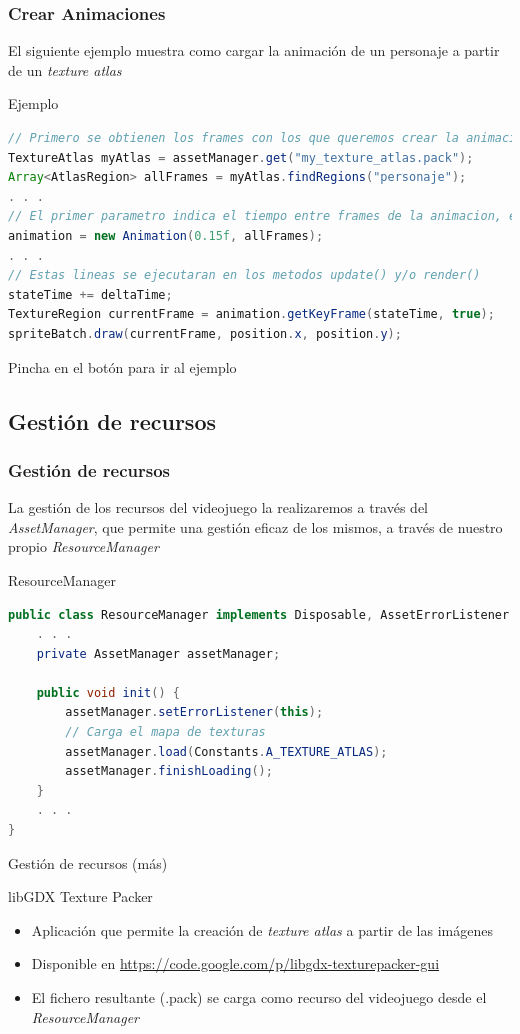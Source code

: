 \documentclass[xcolor={dvipsnames}]{beamer}
\begin{document}
\begin{frame}[fragile]\frametitle{Crear Animaciones}
	El siguiente ejemplo muestra como cargar la animación de un personaje a partir de un \emph{texture atlas}
	\begin{exampleblock}{Ejemplo}
    \begin{lstlisting}[language=java]
// Primero se obtienen los frames con los que queremos crear la animacion
TextureAtlas myAtlas = assetManager.get("my_texture_atlas.pack");
Array<AtlasRegion> allFrames = myAtlas.findRegions("personaje");
. . .
// El primer parametro indica el tiempo entre frames de la animacion, en segundos 
animation = new Animation(0.15f, allFrames);
. . .
// Estas lineas se ejecutaran en los metodos update() y/o render()
stateTime += deltaTime;
TextureRegion currentFrame = animation.getKeyFrame(stateTime, true);
spriteBatch.draw(currentFrame, position.x, position.y);
    \end{lstlisting}
    \end{exampleblock}
    Pincha en el botón para ir al ejemplo \href{https://github.com/sfaci/libgdx}{}
\end{frame}

\subsection{Gestión de recursos}
\begin{frame}[fragile]\frametitle{Gestión de recursos}
	La gestión de los recursos del videojuego la realizaremos a través del \emph{AssetManager}, que permite una gestión eficaz de los mismos, a través de nuestro propio \emph{ResourceManager}
	\begin{exampleblock}{ResourceManager}
	\begin{lstlisting}[language=java]
public class ResourceManager implements Disposable, AssetErrorListener {
    . . .
    private AssetManager assetManager;

    public void init() {
        assetManager.setErrorListener(this);
        // Carga el mapa de texturas
        assetManager.load(Constants.A_TEXTURE_ATLAS);
        assetManager.finishLoading();
    }
    . . .
}
	\end{lstlisting}
	\end{exampleblock}
\end{frame}

\begin{frame}{Gestión de recursos (más)}
	\begin{block}{libGDX Texture Packer}
	\begin{itemize}
		\item Aplicación que permite la creación de \emph{texture atlas} a partir de las imágenes
		\item Disponible en \href{https://code.google.com/p/libgdx-texturepacker-gui}{https://code.google.com/p/libgdx-texturepacker-gui}
		\item El fichero resultante (.pack) se carga como recurso del videojuego desde el \emph{ResourceManager}
	\end{itemize}
	\end{block}
\end{frame}
\end{document}
